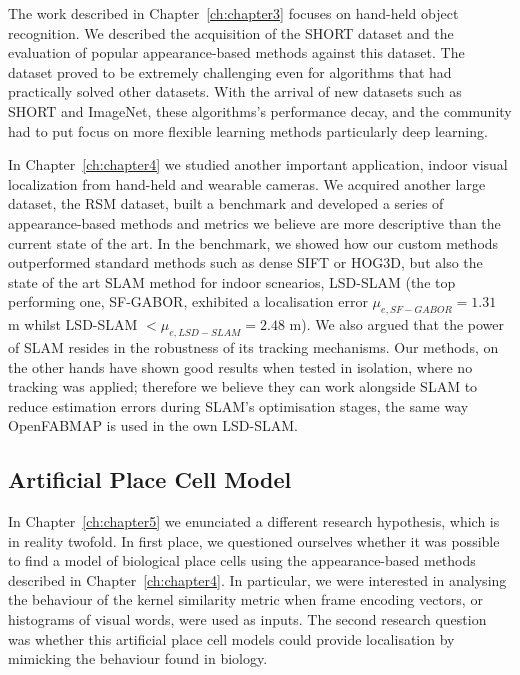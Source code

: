 The work described in Chapter~\ref{ch:chapter3} focuses on hand-held object recognition. We described the acquisition of the SHORT dataset and the evaluation of popular appearance-based methods against this dataset. The dataset proved to be extremely challenging even for algorithms that had practically solved other datasets. With the arrival of new datasets such as SHORT and ImageNet, these algorithms's performance decay, and the community had to put focus on more flexible learning methods particularly deep learning.

In Chapter~\ref{ch:chapter4} we studied another important application, indoor visual localization from hand-held and wearable cameras. We acquired another large dataset, the RSM dataset, built a benchmark and developed a series of appearance-based methods and metrics we believe are more descriptive than the current state of the art. In the benchmark, we showed how our custom methods outperformed standard methods such as dense SIFT or HOG3D, but also the state of the art SLAM method for indoor scnearios, LSD-SLAM (the top performing one, SF-GABOR, exhibited a localisation error $\mu_{e,SF-GABOR} = 1.31 $ m whilst LSD-SLAM $< \mu_{e,LSD-SLAM} = 2.48 $ m).  We also argued that the power of SLAM resides in the robustness of its tracking mechanisms. Our methods, on the other hands have shown good results when tested in isolation, where no tracking was applied; therefore we believe they can work alongside SLAM to reduce estimation errors during SLAM's optimisation stages, the same way OpenFABMAP is used in the own LSD-SLAM.


\subsection{Artificial Place Cell Model}

In Chapter~\ref{ch:chapter5} we enunciated a different research hypothesis, which is in reality twofold. In first place, we questioned ourselves whether it was possible to find  a model of biological place cells using the appearance-based methods described in Chapter~\ref{ch:chapter4}. In particular, we were interested in analysing the behaviour of the kernel similarity metric when frame encoding vectors, or histograms of visual words, were used as inputs. The second research question was whether this artificial place cell models could provide localisation by mimicking the behaviour found in biology.

